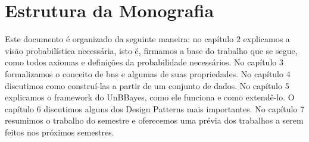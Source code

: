 \section{Estrutura da Monografia}
Este documento é organizado da seguinte maneira: no capítulo 2 explicamos a visão probabilística necessária, isto é, firmamos a base do trabalho que se segue, como todos axiomas e definições da probabilidade necessários. No capítulo 3 formalizamos o conceito de \glspl{bn} e algumas de suas propriedades. No capítulo 4 discutimos como construí-las a partir de um conjunto de dados. No capítulo 5 explicamos o framework do UnBBayes, como ele funciona e como extendê-lo. O capítulo 6 discutimos alguns dos Design Patterns mais importantes. No capítulo 7 resumimos o trabalho do semestre e oferecemos uma prévia dos trabalhos a serem feitos nos próximos semestres.


